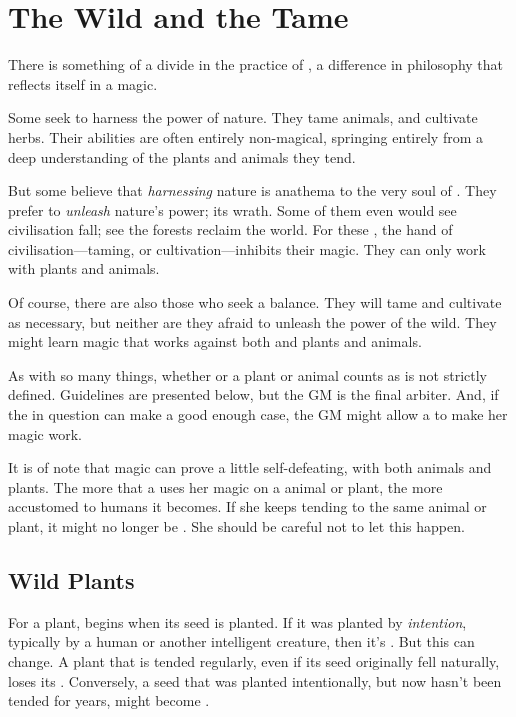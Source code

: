 
\section{The Wild and the Tame}

There is something of a divide in the practice of , a difference in philosophy that reflects itself in a  magic.

Some  seek to harness the power of nature.
They tame animals, and cultivate herbs.
Their abilities are often entirely non-magical, springing entirely from a deep understanding of the plants and animals they tend.

But some believe that \emph{harnessing} nature is anathema to the very soul of .
They prefer to \emph{unleash} nature's power; its wrath.
Some of them even would see civilisation fall; see the forests reclaim the world.
For these , the hand of civilisation---taming, or cultivation---inhibits their magic.
They can only work with {\wild} plants and animals.

Of course, there are also those  who seek a balance.
They will tame and cultivate as necessary, but neither are they afraid to unleash the power of the wild.
They might learn magic that works against both {\wild} and {\nonwild} plants and animals.

As with so many things, whether or a plant or animal counts as {\wild} is not strictly defined.
Guidelines are presented below, but the GM is the final arbiter.
And, if the  in question can make a good enough case, the GM might allow a {\test} to make her magic work.

It is of note that {\wild} magic can prove a little self-defeating, with both animals and plants.
The more that a  uses her magic on a {\wild} animal or plant, the more accustomed to humans it becomes.
If she keeps tending to the same animal or plant, it might no longer be {\wild}.
She should be careful not to let this happen.

\subsection{Wild Plants}

For a plant, {\wildness} begins when its seed is planted.
If it was planted by \emph{intention}, typically by a human or another intelligent creature, then it's {\nonwild}.
But this can change.
A plant that is tended regularly, even if its seed originally fell naturally, loses its {\wildness}.
Conversely, a seed that was planted intentionally, but now hasn't been tended for years, might become {\wild}.

